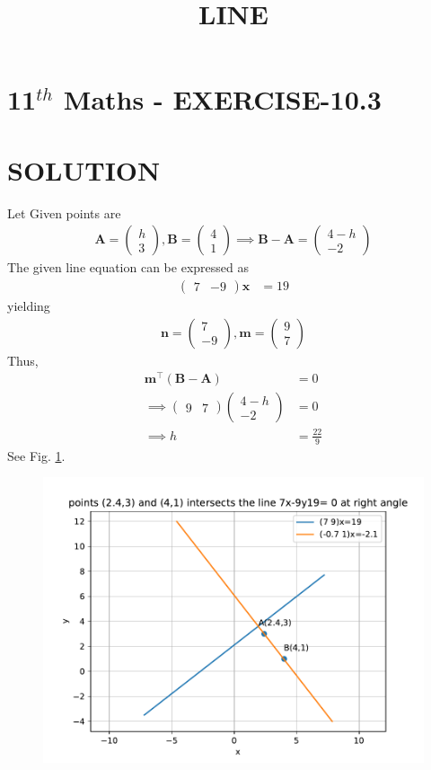 \documentclass[12pt]{article}
\providecommand{\brak}[1]{\ensuremath{\left(#1\right)}}
\newcommand{\myvec}[1]{\ensuremath{\begin{pmatrix}#1\end{pmatrix}}}
\let\vec\mathbf
\begin{document}
\begin{center}
\title{\textbf{LINE}}
\date{\vspace{-5ex}} %
\maketitle
\end{center}

\section{11$^{th}$ Maths - EXERCISE-10.3}
\begin{enumerate}
\end{enumerate}
\section{SOLUTION}
\fi
Let
Given points are 
\begin{align}
\vec{A}=\myvec{h\\ 3},\vec{B}=\myvec{4\\ 1} 
\implies \vec{B}-\vec{A}=
\myvec{4-h\\ -2}
\end{align}
The given line equation  can be expressed as
\begin{align}
\myvec{7& -9}\vec{x}&=19
\end{align}
yielding 
\begin{align}
\vec{n}=\myvec{7\\ -9},
\vec{m}=\myvec{9\\ 7}
\end{align}
Thus, 
\begin{align}
	\vec{m}^\top\brak{\vec{B}- \vec{A}}&=0\\
\implies\myvec{9& 7}\myvec{4-h\\ -2}&=0\\
\implies h&=\frac{22}{9}
\end{align}
See Fig. 
		\ref{fig:chapters/11/10/3/10/Figure}.
\begin{figure}[h]
\centering
\includegraphics[width=\columnwidth]{chapters/11/10/3/10/figs/fig.pdf}
\caption{}
		\label{fig:chapters/11/10/3/10/Figure}
\end{figure}
\end{document}
